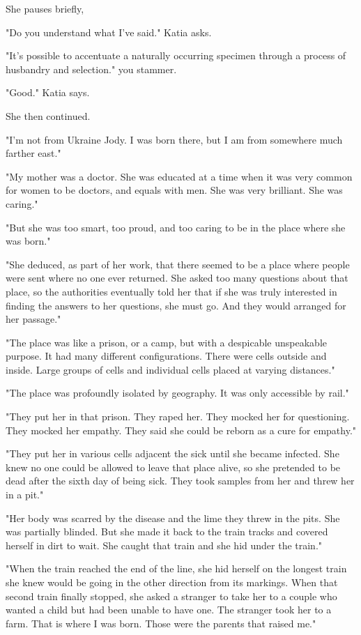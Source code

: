 \documentclass[a5paper, symmetric]{tufte-book}
\begin{document}
She pauses briefly,

"Do you understand what I've said." Katia asks.

"It's possible to accentuate a naturally occurring specimen through a process of husbandry and selection." you stammer.

"Good." Katia says.

She then continued.

"I'm not from Ukraine Jody. I was born there, but I am from somewhere much farther east."

"My mother was a doctor. She was educated at a time when it was very common for women to be doctors, and equals with men. She was very brilliant. She was caring."

"But she was too smart, too proud, and too caring to be in the place where she was born."

"She deduced, as part of her work, that there seemed to be a place where people were sent where no one ever returned. She asked too many questions about that place, so the authorities eventually told her that if she was truly interested in finding the answers to her questions, she must go. And they would arranged for her passage."

"The place was like a prison, or a camp, but with a despicable unspeakable purpose. It had many different configurations. There were cells outside and inside. Large groups of cells and individual cells placed at varying distances."

"The place was profoundly isolated by geography. It was only accessible by rail."

"They put her in that prison. They raped her. They mocked her for questioning. They mocked her empathy. They said she could be reborn as a cure for empathy."

"They put her in various cells adjacent the sick until she became infected. She knew no one could be allowed to leave that place alive, so she pretended to be dead after the sixth day of being sick. They took samples from her and threw her in a pit." 

"Her body was scarred by the disease and the lime they threw in the pits. She was partially blinded. But she made it back to the train tracks and covered herself in dirt to wait. She caught that train and she hid under the train." 

"When the train reached the end of the line, she hid herself on the longest train she knew would be going in the other direction from its markings. When that second train finally stopped, she asked a stranger to take her to a couple who wanted a child but had been unable to have one. The stranger took her to a farm. That is where I was born. Those were the parents that raised me." 
\end{document}
